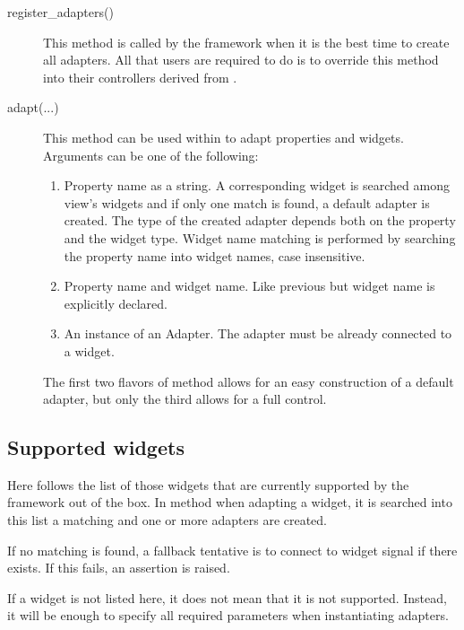 \begin{description} 
\item [register\_adapters()] This method is called by the framework
  when it is the best time to create all adapters. All that users
  are required to do is to override this method into their
  controllers derived from .

\item [adapt(...)] This method can be used within
   to adapt properties and
  widgets. Arguments can be one of the following:

  \begin{enumerate}
  \item Property name as a string. A corresponding widget is
    searched among view's widgets and if only one match is found, a
    default adapter is created. The type of the created adapter
    depends both on the property and the widget type. Widget name
    matching is performed by searching the property name into widget
    names, case insensitive.

  \item Property name and widget name. Like previous but widget name
    is explicitly declared.

  \item An instance of an Adapter. The adapter must be already
    connected to a widget.
  \end{enumerate}

  The first two flavors of method  allows for an
  easy construction of a default adapter, but only the third allows
  for a full control.

\end{description}


\subsection{Supported widgets}
\label{SUPW}

Here follows the list of those widgets that are currently supported
by the framework out of the box. In method
 when adapting a widget, it is searched
into this list a matching and one or more adapters are created.

If no matching is found, a fallback tentative is to connect to
widget signal  if there exists. If this fails,
an assertion is raised.

If a widget is not listed here, it does not mean that it is not
supported. Instead, it will be enough to specify all required
parameters when instantiating adapters.

